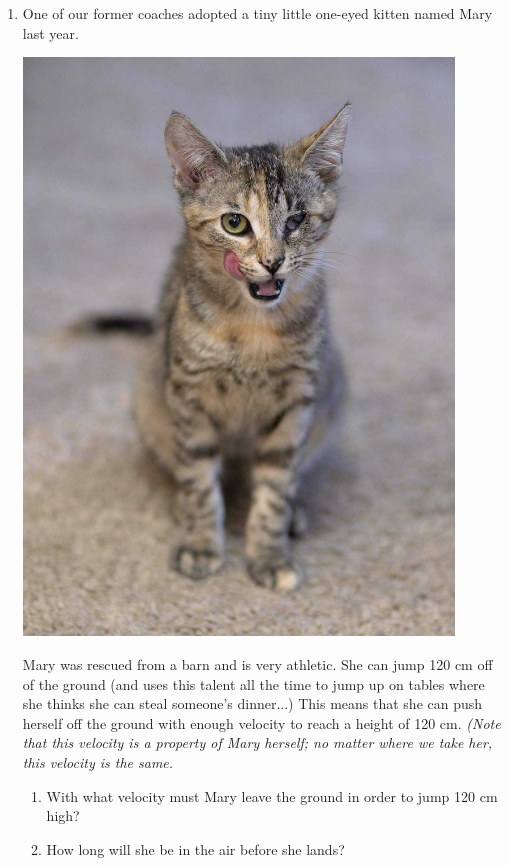 \documentclass[12pt]{article}
\begin{document}
\begin{enumerate}
\bigskip
\bigskip

\item One of our former coaches adopted a tiny little one-eyed kitten named Mary last year. 

\bigskip
\begin{minipage}{0.45\textwidth}

	\includegraphics[width=0.9\textwidth]{mary1.jpg}
\end{minipage}
\begin{minipage}{0.55\textwidth} Mary was rescued from a barn and is very athletic. She can jump 120 cm off of the ground (and uses this talent all the time to jump up on tables where she thinks she can steal someone's dinner...) This means that she can push herself off the ground with enough velocity to reach a height of 120 cm. {\it (Note that this velocity is a property of Mary herself; no matter where we take her, this velocity is the same.}

\begin{enumerate}
\item With what velocity must Mary leave the ground in order to jump 120 cm high?
\item How long will she be in the air before she lands?
\end{enumerate}
\end{minipage}
\newpage



\end{enumerate}
\end{document}
